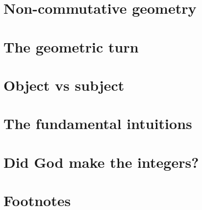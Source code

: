 \documentclass{article}
\begin{document}
\section{Non-commutative geometry}


\section{The geometric turn}
\section{Object vs subject}
\section{The fundamental intuitions}
\section{Did God make the integers?}
\section*{Footnotes}
\end{document}
